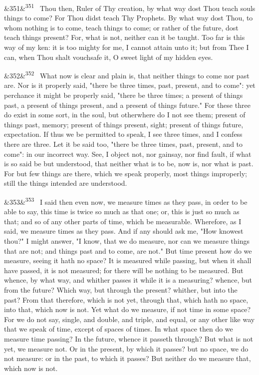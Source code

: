 \documentclass[12pt]{article}
\newcommand{\para}[1][]{\par\noindent\ifx&#1&\else\textsuperscript{\footnotesize #1}~\fi}
\begin{document}
\para[351] Thou then, Ruler of Thy creation, by what way dost Thou teach souls things to come? For Thou didst teach Thy Prophets. By what way dost Thou, to whom nothing is to come, teach things to come; or rather of the future, dost teach things present? For, what is not, neither can it be taught. Too far is this way of my ken: it is too mighty for me, I cannot attain unto it; but from Thee I can, when Thou shalt vouchsafe it, O sweet light of my hidden eyes.

\para[352] What now is clear and plain is, that neither things to come nor past are. Nor is it properly said, "there be three times, past, present, and to come": yet perchance it might be properly said, "there be three times; a present of things past, a present of things present, and a present of things future." For these three do exist in some sort, in the soul, but otherwhere do I not see them; present of things past, memory; present of things present, sight; present of things future, expectation. If thus we be permitted to speak, I see three times, and I confess there are three. Let it be said too, "there be three times, past, present, and to come": in our incorrect way. See, I object not, nor gainsay, nor find fault, if what is so said be but understood, that neither what is to be, now is, nor what is past. For but few things are there, which we speak properly, most things improperly; still the things intended are understood.

\para[353] I said then even now, we measure times as they pass, in order to be able to say, this time is twice so much as that one; or, this is just so much as that; and so of any other parts of time, which be measurable. Wherefore, as I said, we measure times as they pass. And if any should ask me, "How knowest thou?" I might answer, "I know, that we do measure, nor can we measure things that are not; and things past and to come, are not." But time present how do we measure, seeing it hath no space? It is measured while passing, but when it shall have passed, it is not measured; for there will be nothing to be measured. But whence, by what way, and whither passes it while it is a measuring? whence, but from the future? Which way, but through the present? whither, but into the past? From that therefore, which is not yet, through that, which hath no space, into that, which now is not. Yet what do we measure, if not time in some space? For we do not say, single, and double, and triple, and equal, or any other like way that we speak of time, except of spaces of times. In what space then do we measure time passing? In the future, whence it passeth through? But what is not yet, we measure not. Or in the present, by which it passes? but no space, we do not measure: or in the past, to which it passes? But neither do we measure that, which now is not.
\end{document}
